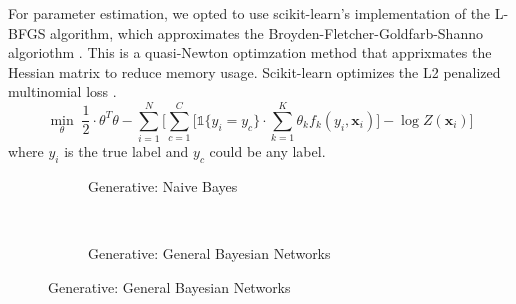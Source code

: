 \documentclass{article}
\begin{document}
For parameter estimation, we opted to use scikit-learn's implementation
of the L-BFGS algorithm, which approximates the Broyden-Fletcher-Goldfarb-Shanno
algoriothm \cite{scikit-learn}. This is a quasi-Newton optimzation method that apprixmates the
Hessian matrix to reduce memory usage. Scikit-learn optimizes the L2 penalized
multinomial loss \cite{scikit-learn} \cite{murphy}.
\begin{equation}
  \min_{\theta} \; \frac{1}{2} \cdot \theta^T \theta - \sum_{i=1}^N \Bigg[ \sum_{c=1}^C \Bigg[ \mathds{1} \{ y_i = y_c \} \cdot \sum_{k=1}^K \theta_k f_k\left( y_i, \mathbf{x}_i \right) \Bigg] - \log Z(\mathbf{x}_i)  \Bigg]
\end{equation}
where $y_i$ is the true label and $y_c$ could be any label.

\begin{figure}
    \centering
    \begin{subfigure}[t]{0.45\textwidth}
        \centering
        \caption*{Generative: Naive Bayes}
    \end{subfigure}%
    ~
    \begin{subfigure}[t]{0.45\textwidth}
        \centering
        \caption*{Generative: General Bayesian Networks}
    \end{subfigure}


\end{figure}
\end{document}
